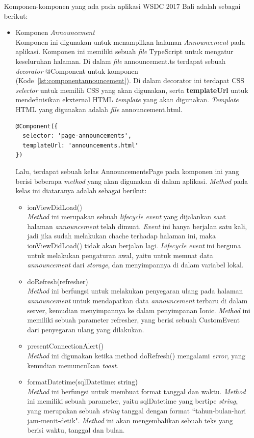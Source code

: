 Komponen-komponen yang ada pada aplikasi WSDC 2017 Bali adalah sebagai berikut:

\begin{itemize}
	\item Komponen \textit{Announcement} \\
	Komponen ini digunakan untuk menampilkan halaman \textit{Announcement} pada aplikasi. Komponen ini memiliki sebuah \textit{file} TypeScript untuk mengatur keseluruhan halaman. Di dalam \textit{file} announcement.ts terdapat sebuah \textit{decorator} @Component untuk komponen (Kode~\ref{lst:componentannouncement}). Di dalam decorator ini terdapat CSS \textit{selector} untuk memilih CSS yang akan digunakan, serta \textbf{templateUrl} untuk mendefinisikan ekxternal HTML \textit{template} yang akan digunakan. \textit{Template} HTML yang digunakan adalah \textit{file} announcement.html. 
\begin{lstlisting}[language=html, label={lst:componentannouncement}, caption=@Component pada annoncement.ts]
@Component({
  selector: 'page-announcements',
  templateUrl: 'announcements.html'
})
\end{lstlisting} 
	Lalu, terdapat sebuah kelas AnnouncementsPage pada komponen ini yang berisi beberapa \textit{method} yang akan digunakan di dalam aplikasi. \textit{Method} pada kelas ini diataranya adalah sebagai berikut:
	\begin{itemize}
		\item ionViewDidLoad() \\
		\textit{Method} ini merupakan sebuah \textit{lifecycle event} yang dijalankan saat halaman \textit{announcement} telah dimuat. \textit{Event} ini hanya berjalan satu kali, jadi jika sudah melakukan chache terhadap halaman ini, maka ionViewDidLoad() tidak akan berjalan lagi. \textit{Lifecycle event} ini berguna untuk melakukan pengaturan awal, yaitu untuk memuat data \textit{announcement} dari \textit{storage}, dan menyimpannya di dalam variabel lokal. 
		\item doRefresh(refresher) \\
		\textit{Method} ini berfungsi untuk melakukan penyegaran ulang pada halaman \textit{announcement} untuk mendapatkan data \textit{announcement} terbaru di dalam server, kemudian menyimpannya ke dalam penyimpanan Ionic. \textit{Method} ini memiliki sebuah parameter refresher, yang berisi sebuah CustomEvent dari penyegaran ulang yang dilakukan.
		\item presentConnectionAlert() \\
		\textit{Method} ini digunakan ketika method doRefresh() mengalami \textit{error}, yang kemudian memunculkan \textit{toast}.
		\item formatDatetime(sqlDatetime: string) \\
		\textit{Method} ini berfungsi untuk membuat format tanggal dan waktu. \textit{Method} ini memiliki sebuah parameter, yaitu sqlDatetime yang bertipe \textit{string}, yang merupakan sebuah \textit{string} tanggal dengan format ``tahun-bulan-hari jam-menit-detik". \textit{Method} ini akan mengembalikan sebuah teks yang berisi waktu, tanggal dan bulan.
	\end{itemize}


\end{itemize}
